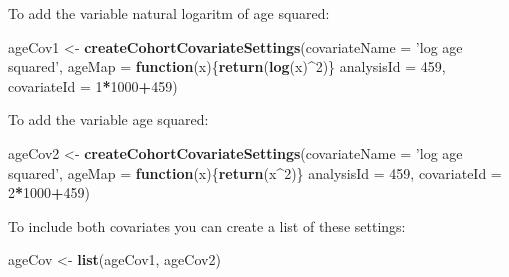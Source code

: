\documentclass[
]{article}
\newenvironment{Shaded}{\begin{snugshade}}{\end{snugshade}}
\newcommand{\ControlFlowTok}[1]{\textcolor[rgb]{0.13,0.29,0.53}{\textbf{#1}}}
\newcommand{\DataTypeTok}[1]{\textcolor[rgb]{0.13,0.29,0.53}{#1}}
\newcommand{\DecValTok}[1]{\textcolor[rgb]{0.00,0.00,0.81}{#1}}
\newcommand{\KeywordTok}[1]{\textcolor[rgb]{0.13,0.29,0.53}{\textbf{#1}}}
\newcommand{\NormalTok}[1]{#1}
\newcommand{\OperatorTok}[1]{\textcolor[rgb]{0.81,0.36,0.00}{\textbf{#1}}}
\newcommand{\StringTok}[1]{\textcolor[rgb]{0.31,0.60,0.02}{#1}}
\begin{document}
To add the variable natural logaritm of age squared:

\begin{Shaded}
\begin{Highlighting}[]
\NormalTok{ageCov1 <-}\StringTok{ }\KeywordTok{createCohortCovariateSettings}\NormalTok{(}\DataTypeTok{covariateName =} \StringTok{'log age squared'}\NormalTok{,}
                                            \DataTypeTok{ageMap =} \ControlFlowTok{function}\NormalTok{(x)\{}\KeywordTok{return}\NormalTok{(}\KeywordTok{log}\NormalTok{(x)}\OperatorTok{^}\DecValTok{2}\NormalTok{)\}}
                                            \DataTypeTok{analysisId =} \DecValTok{459}\NormalTok{,}
                                            \DataTypeTok{covariateId =} \DecValTok{1}\OperatorTok{*}\DecValTok{1000}\OperatorTok{+}\DecValTok{459}\NormalTok{)}
\end{Highlighting}
\end{Shaded}

To add the variable age squared:

\begin{Shaded}
\begin{Highlighting}[]
\NormalTok{ageCov2 <-}\StringTok{ }\KeywordTok{createCohortCovariateSettings}\NormalTok{(}\DataTypeTok{covariateName =} \StringTok{'log age squared'}\NormalTok{,}
                                            \DataTypeTok{ageMap =} \ControlFlowTok{function}\NormalTok{(x)\{}\KeywordTok{return}\NormalTok{(x}\OperatorTok{^}\DecValTok{2}\NormalTok{)\}}
                                            \DataTypeTok{analysisId =} \DecValTok{459}\NormalTok{,}
                                            \DataTypeTok{covariateId =} \DecValTok{2}\OperatorTok{*}\DecValTok{1000}\OperatorTok{+}\DecValTok{459}\NormalTok{)}
\end{Highlighting}
\end{Shaded}

To include both covariates you can create a list of these settings:

\begin{Shaded}
\begin{Highlighting}[]
\NormalTok{ageCov <-}\StringTok{ }\KeywordTok{list}\NormalTok{(ageCov1, ageCov2)}
\end{Highlighting}
\end{Shaded}
\end{document}
